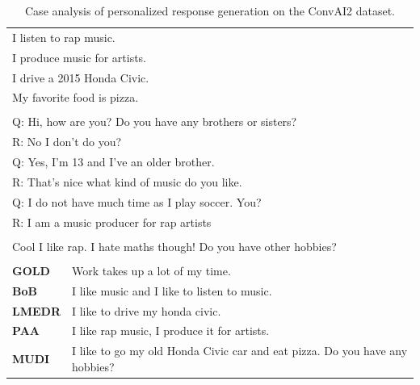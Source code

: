 \documentclass[letterpaper]{article} %
\begin{document}

\begin{table}[ht]
\centering
\def\arraystretch{1.2}%
\begin{tabular}{|l|p{11cm}|}

\hline
\rowcolor{yellow}
\multicolumn{2}{|c|}{\textbf{Persona}} \\
\hline
\multicolumn{2}{|l|}{I listen to rap music.} \\
\multicolumn{2}{|l|}{I produce music for artists.} \\
\multicolumn{2}{|l|}{I drive a 2015 Honda Civic.} \\
\multicolumn{2}{|l|}{My favorite food is pizza.} \\
\hline

\rowcolor{yellow}
\multicolumn{2}{|c|}{\textbf{Context}} \\
\hline
\multicolumn{2}{|l|}{Q: Hi, how are you? Do you have any brothers or sisters?} \\
\multicolumn{2}{|l|}{R: No I don't do you?} \\
\multicolumn{2}{|l|}{Q: Yes, I'm 13 and I've an older brother.} \\
\multicolumn{2}{|l|}{R: That's nice what kind of music do you like.} \\
\multicolumn{2}{|l|}{Q: I do not have much time as I play soccer. You?} \\
\multicolumn{2}{|l|}{R: I am a music producer for rap artists} \\
\hline

\rowcolor{yellow}
\multicolumn{2}{|c|}{\textbf{Query}} \\
\hline
\multicolumn{2}{|l|}{Cool I like rap. I hate maths though! Do you have other hobbies?} \\

\hhline{|==|}
\rowcolor[RGB]{204,217,245}
\multicolumn{2}{|c|}{\textbf{Response}} \\
\hhline{|==|}
\textbf{GOLD} & Work takes up a lot of my time. \\
\textbf{BoB} & I like music and I like to listen to music. \\
\textbf{LMEDR} & I like to drive my honda civic. \\
\textbf{PAA} & I like rap music, I produce it for artists. \\
\textbf{MUDI} & I like to go my old Honda Civic car and eat pizza. Do you have any hobbies? \\

\hline
\end{tabular}
\caption{Case analysis of personalized response generation on the ConvAI2 dataset.}
\label{table:case_study_3}
\end{table}
\end{document}
